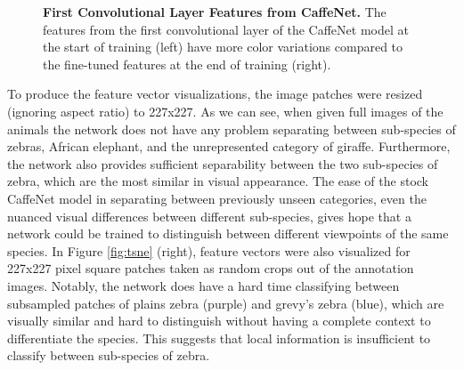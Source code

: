 \begin{figure}[t]%
    \centering
        \caption[First Convolutional Layer Features from CaffeNet]{\textbf{First Convolutional Layer Features from CaffeNet.}  The features from the first convolutional layer of the CaffeNet model at the start of training (left) have more color variations compared to the fine-tuned features at the end of training (right).}
        \label{fig:features}
\end{figure}

To produce the feature vector visualizations, the image patches were resized (ignoring aspect ratio) to 227x227.  As we can see, when given full images of the animals the network does not have any problem separating between sub-species of zebras, African elephant, and the unrepresented category of giraffe.  Furthermore, the network also provides sufficient separability between the two sub-species of zebra, which are the most similar in visual appearance.  The ease of the stock CaffeNet model in separating between previously unseen categories, even the nuanced visual differences between different sub-species, gives hope that a network could be trained to distinguish between different viewpoints of the same species.  In Figure \ref{fig:tsne} (right), feature vectors were also visualized for 227x227 pixel square patches taken as random crops out of the annotation images.  Notably, the network does have a hard time classifying between subsampled patches of plains zebra (purple) and grevy's zebra (blue), which are visually similar and hard to distinguish without having a complete context to differentiate the species.  This suggests that local information is insufficient to classify between sub-species of zebra.


